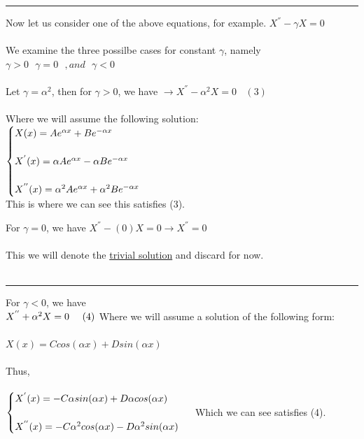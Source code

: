 \documentclass[fleqn]{article}
\begin{document}
\begin{enumerate}
\begin{enumerate}
      \textcolor{hwColor}{ 
        \rule{16cm}{1pt} 
      }

      \textcolor{hwColor}{
        Now let us consider one of the above equations, for example. $X^{''}-\gamma X=0$ \\
        \\
        We examine the three possilbe cases for constant $\gamma$, namely $\gamma >0 ~~~ \gamma=0 ~~~ ,and ~~~ \gamma <0$ \\
        \\
        Let $\gamma=\alpha^2$, then for $\gamma > 0$, we have $\rightarrow X^{''}-\alpha^2 X=0 ~~~~ (3)$ \\
        \\
        Where we will assume the following solution: \\
        $
          \begin{cases}
            X(x)=Ae^{\alpha x}+B e^{-\alpha x} \\
            \\
            X^{'}(x)=\alpha Ae^{\alpha x}- \alpha B e^{-\alpha x} \\
            \\
            X^{''}(x)=\alpha^2 Ae^{\alpha x}+\alpha^2 Be^{-\alpha x}
          \end{cases} \\
        $
        \\
        This is where we can see this satisfies (3).
      }

      \textcolor{hwColor}{
        For $\gamma=0$, we have $X^{''}-(0)X=0 \longrightarrow X^{''}=0$ \\
        \\
        This we will denote the \underline{trivial solution} and discard for now. \\
        \\
      }

      \textcolor{hwColor}{ 
        \rule{16cm}{1pt} 
      }

      \textcolor{hwColor}{
        For $\gamma<0$, we have \\
        $
          X^{''}+\alpha^2 X=0 ~~~~ (4) \\
          \\
        $
        Where we will assume a solution of the following form: \\
        \\
        $X(x)=Ccos(\alpha x)+Dsin(\alpha x)$ \\
        \\
        Thus,\\
        \\
        $
          \begin{cases}
            X^{'}(x)=-C\alpha sin(\alpha x)+D \alpha cos(\alpha x) \\
            \\
            X^{''}(x)=-C \alpha^2 cos(\alpha x)-D \alpha^2 sin(\alpha x)
          \end{cases} \\
        $
        Which we can see satisfies (4).
      }


\end{enumerate}
\end{enumerate}
\end{document}
